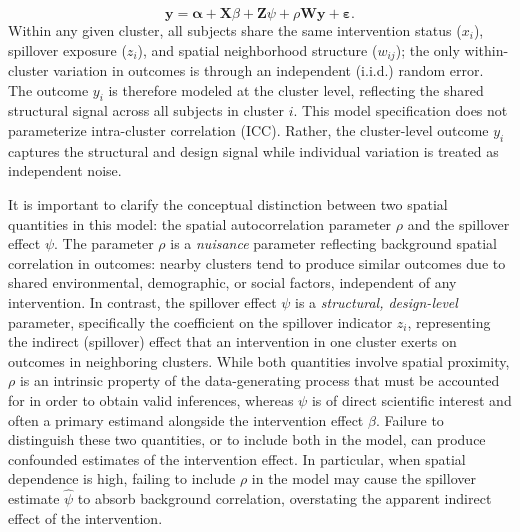 \documentclass{article}[11pt]
\begin{document}
\begin{equation*}
    \mathbf{y} = \boldsymbol\alpha + \mathbf{X}\beta + \mathbf{Z}\psi + \rho\mathbf{W}\mathbf{y} + \boldsymbol\varepsilon.
\end{equation*}
\noindent Within any given cluster, all subjects share the same intervention status ($x_i$), spillover exposure ($z_i$), and spatial neighborhood structure ($w_{ij}$); the only within-cluster variation in outcomes is through an independent (i.i.d.) random error. The outcome $y_i$ is therefore modeled at the cluster level, reflecting the shared structural signal across all subjects in cluster $i$. This model specification does not parameterize intra-cluster correlation (ICC). Rather, the cluster-level outcome $y_i$ captures the structural and design signal while individual variation is treated as independent noise.

It is important to clarify the conceptual distinction between two spatial quantities in this model: the spatial autocorrelation parameter $\rho$ and the spillover effect $\psi$. The parameter $\rho$ is a \emph{nuisance} parameter reflecting background spatial correlation in outcomes: nearby clusters tend to produce similar outcomes due to shared environmental, demographic, or social factors, independent of any intervention. In contrast, the spillover effect $\psi$ is a \emph{structural, design-level} parameter, specifically the coefficient on the spillover indicator $z_i$, representing the indirect (spillover) effect that an intervention in one cluster exerts on outcomes in neighboring clusters. While both quantities involve spatial proximity, $\rho$ is an intrinsic property of the data-generating process that must be accounted for in order to obtain valid inferences, whereas $\psi$ is of direct scientific interest and often a primary estimand alongside the intervention effect $\beta$. Failure to distinguish these two quantities, or to include both in the model, can produce confounded estimates of the intervention effect. In particular, when spatial dependence is high, failing to include $\rho$ in the model may cause the spillover estimate $\hat{\psi}$ to absorb background correlation, overstating the apparent indirect effect of the intervention.
\end{document}
